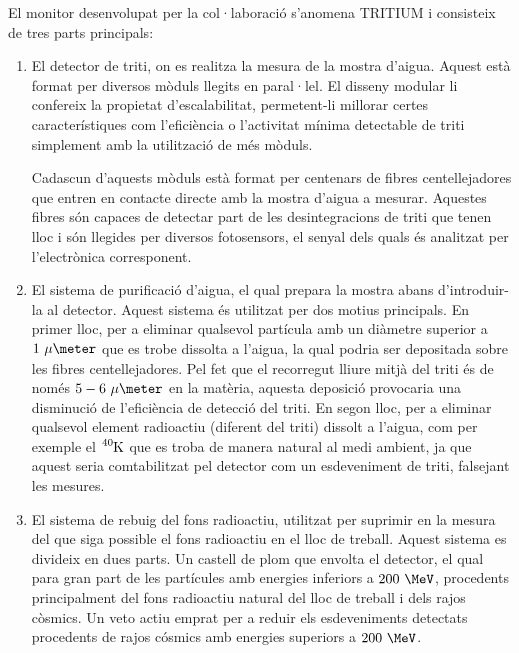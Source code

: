 El monitor desenvolupat per la col·laboració s'anomena TRITIUM i consisteix de tres parts principals:

\begin{enumerate}

\item{} El detector de triti, on es realitza la mesura de la mostra d'aigua. Aquest està format per diversos mòduls llegits en paral·lel. El disseny modular li confereix la propietat d'escalabilitat, permetent-li millorar certes característiques com l'eficiència o l'activitat mínima detectable de triti simplement amb la utilització de més mòduls.

Cadascun d'aquests mòduls està format per centenars de fibres centellejadores que entren en contacte directe amb la mostra d'aigua a mesurar. Aquestes fibres són capaces de detectar part de les desintegracions de triti que tenen lloc i són llegides per diversos fotosensors, el senyal dels quals és analitzat per l'electrònica corresponent.

\item{} El sistema de purificació d'aigua, el qual prepara la mostra abans d'introduir-la al detector. Aquest sistema és utilitzat per dos motius principals. En primer lloc, per a eliminar qualsevol partícula amb un diàmetre superior a $1~\mu\meter$ que es trobe dissolta a l'aigua, la qual podria ser depositada sobre les fibres centellejadores. Pel fet que el recorregut lliure mitjà del triti és de només $5-6~\mu\meter$ en la matèria, aquesta deposició provocaria una disminució de l'eficiència de detecció del triti. En segon lloc, per a eliminar qualsevol element radioactiu (diferent del triti) dissolt a l'aigua, com per exemple el $\ce{^{40}K}$ que es troba de manera natural al medi ambient, ja que aquest seria comtabilitzat pel detector com un esdeveniment de triti, falsejant les mesures.

\item{} El sistema de rebuig del fons radioactiu, utilitzat per suprimir en la mesura del que siga possible el fons radioactiu en el lloc de treball. Aquest sistema es divideix en dues parts. Un castell de plom que envolta el detector, el qual para gran part de les partícules amb energies inferiors a $200~\MeV$, procedents principalment del fons radioactiu natural del lloc de treball i dels rajos còsmics. Un veto actiu emprat per a reduir els esdeveniments detectats procedents de rajos cósmics amb energies superiors a $200~\MeV$.

\end{enumerate}

